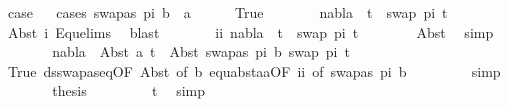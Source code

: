 \begin{isabellebody}
\ {\isacharquery}{\kern0pt}case\isanewline
\ \ \isamarkupfalse%
{\isacharparenleft}{\kern0pt}cases\ {\isacartoucheopen}swapas\ pi{}\ b\ {\isacharequal}{\kern0pt}\ a{\isacartoucheclose}{\isacharparenright}{\kern0pt}\isanewline
\ \ \ \ \isamarkupfalse%
\ True\isanewline
\ \ \ \ \isamarkupfalse%
\ \isamarkupfalse%
\ {\isachardoublequoteopen}nabla\ {\isasymturnstile}\ t{}{\isacharprime}{\kern0pt}\ {\isasymapprox}\ swap\ pi{}\ t{}{\isacharprime}{\kern0pt}{\isachardoublequoteclose}\ \isanewline
\ \ \ \ \ \ \isamarkupfalse%
\ Abst\ i\ Equ{\isacharunderscore}{\kern0pt}elims{\isacharparenleft}{\kern0pt}{}{\isacharparenright}{\kern0pt}\ \isamarkupfalse%
\ blast\isanewline
\ \ \ \ \isamarkupfalse%
\ \isamarkupfalse%
\ ii{\isacharcolon}{\kern0pt}\ {\isachardoublequoteopen}nabla\ {\isasymturnstile}\ t{}{\isacharprime}{\kern0pt}\ {\isasymapprox}\ swap\ pi{}\ t{}{\isacharprime}{\kern0pt}{\isachardoublequoteclose}\isanewline
\ \ \ \ \ \ \isamarkupfalse%
\ Abst\ \isamarkupfalse%
\ simp\isanewline
\ \ \ \ \isamarkupfalse%
\ \isamarkupfalse%
\ {\isachardoublequoteopen}nabla\ {\isasymturnstile}\ Abst\ a\ t{}{\isacharprime}{\kern0pt}\ {\isasymapprox}\ Abst\ {\isacharparenleft}{\kern0pt}swapas\ pi{}\ b{\isacharparenright}{\kern0pt}\ {\isacharparenleft}{\kern0pt}swap\ pi{}\ t{}{\isacharprime}{\kern0pt}{\isacharparenright}{\kern0pt}{\isachardoublequoteclose}\isanewline
\ \ \ \ \ \ \isamarkupfalse%
\ True\ ds{\isacharunderscore}{\kern0pt}swapas{\isacharunderscore}{\kern0pt}eq{\isacharbrackleft}{\kern0pt}OF\ Abst{\isacharparenleft}{\kern0pt}{}{\isacharparenright}{\kern0pt}{\isacharcomma}{\kern0pt}\ of\ b{\isacharbrackright}{\kern0pt}\ equ{\isacharunderscore}{\kern0pt}abst{\isacharunderscore}{\kern0pt}aa{\isacharbrackleft}{\kern0pt}OF\ ii{\isacharcomma}{\kern0pt}\ of\ {\isacartoucheopen}swapas\ pi{}\ b{\isacartoucheclose}{\isacharbrackright}{\kern0pt}\ \isanewline
\ \ \ \ \ \ \isamarkupfalse%
\ simp\isanewline
\ \ \ \ \isamarkupfalse%
\ \isamarkupfalse%
\ {\isacharquery}{\kern0pt}thesis\ \isanewline
\ \ \ \ \ \ \isamarkupfalse%
\ t{}\ \isamarkupfalse%
\ simp\isanewline
\ \ \isamarkupfalse%

\end{isabellebody}
